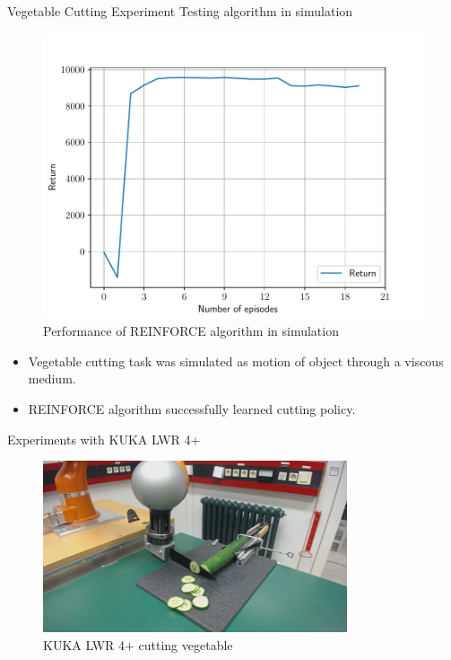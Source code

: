 \documentclass[aspectratio=169]{beamer}
\begin{document}
\begin{frame}{Vegetable Cutting Experiment}
		\vspace{-0.5cm}
		Testing algorithm in simulation

		\begin{minipage}[t]{0.51\textwidth}
		\begin{figure}
			\includegraphics[width=\textwidth]{images/exp/cut/sim_return}
			\caption{Performance of REINFORCE algorithm in simulation}
		\end{figure}
		\end{minipage}
		\hfill
		\begin{minipage}[t]{0.47\textwidth}
			\small
			\vspace{0.5cm}
				\begin{itemize}
					\item Vegetable cutting task was simulated as motion of object through a viscous medium.
					\item REINFORCE algorithm successfully learned cutting policy.
				\end{itemize}
		\end{minipage}
\end{frame}

\begin{frame}
	Experiments with KUKA LWR 4+
	\begin{figure}
		\centering
		\includegraphics[width=0.8\textwidth]{images/exp/cut_veg_exp}
		\caption{KUKA LWR 4+ cutting vegetable}
	\end{figure}
\end{frame}
\end{document}
